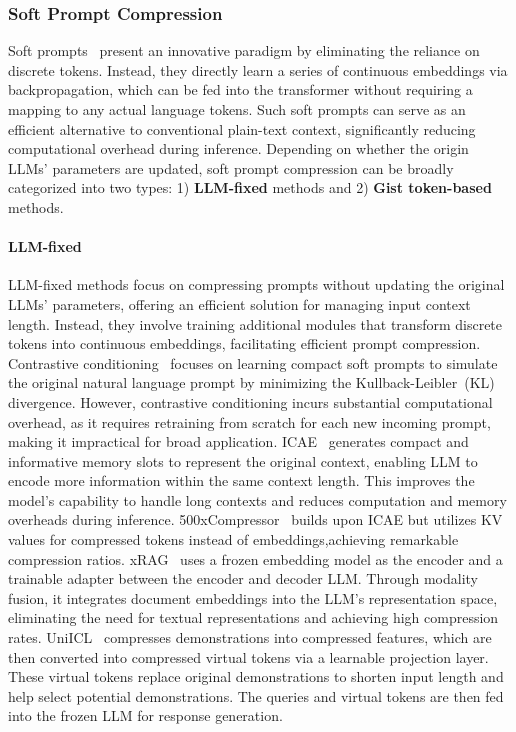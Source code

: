 \documentclass[11pt, a4paper, logo, copyright, nonumbering]{map}
\begin{document}
\subsubsection{Soft Prompt Compression}
\label{sec:soft-prompt-compression}
Soft prompts~\cite{lester-etal-2021-power} present an innovative paradigm by eliminating the reliance on discrete tokens. Instead, they directly learn a series of continuous embeddings via backpropagation, which can be fed into the transformer without requiring a mapping to any actual language tokens. Such soft prompts can serve as an efficient alternative to conventional plain-text context, significantly reducing computational overhead during inference. Depending on whether the origin LLMs' parameters are updated, soft prompt compression can be broadly categorized into two types: 1) \textbf{LLM-fixed} methods and 2) \textbf{Gist token-based} methods.

\paragraph{LLM-fixed}
LLM-fixed methods focus on compressing prompts without updating the original LLMs' parameters, offering an efficient solution for managing input context length. Instead, they involve training additional modules that transform discrete tokens into continuous embeddings, facilitating efficient prompt compression. Contrastive conditioning~\cite{wingate-etal-2022-prompt} focuses on learning compact soft prompts to simulate the original natural language prompt by minimizing the Kullback-Leibler~(KL) divergence. However, contrastive conditioning incurs substantial computational overhead, as it requires retraining from scratch for each new incoming prompt, making it impractical for broad application.
ICAE~\cite{ge2024incontext} generates compact and informative memory slots to represent the original context, enabling LLM to encode more information within the same context length. This improves the model’s capability to handle long contexts and reduces computation and memory overheads during inference. 
500xCompressor~\cite{li2024500xcompressorgeneralizedpromptcompression} builds upon ICAE but utilizes KV values for compressed tokens instead of embeddings,achieving remarkable compression ratios. xRAG~\cite{cheng2024xrag} uses a frozen embedding model as the encoder and a trainable adapter between the encoder and decoder LLM. Through modality fusion, it integrates document embeddings into the LLM's representation space, eliminating the need for textual representations and achieving high compression rates.
UniICL~\cite{gao2024unifyingdemonstrationselectioncompression} compresses demonstrations into compressed features, which are then converted into compressed virtual tokens via a learnable projection layer. These virtual tokens replace original demonstrations to shorten input length and help select potential demonstrations. The queries and virtual tokens are then fed into the frozen LLM for response generation.
\end{document}
